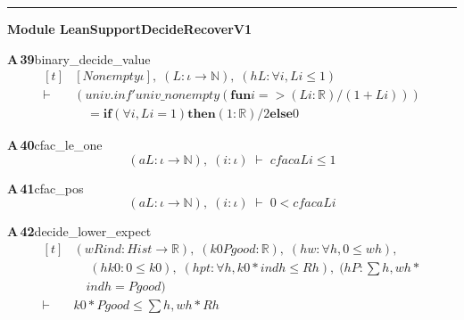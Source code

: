 \documentclass[conference]{IEEEtran}
\theoremstyle{definition}
\newcommand{\lean}[1]{\textsf{\footnotesize #1}}
\begin{document}
\vspace{4pt}\noindent\rule{\columnwidth}{0.4pt}\par\vspace{2pt}
\noindent\textbf{Module \lean{LeanSupportDecideRecoverV1}}\par\vspace{3pt}

\noindent\textbf{A\,39}\quad\lean{binary\_decide\_value}
{\footnotesize\[ \begin{aligned}[t]
&[\mathit{Nonempty} \iota ],\; (\mathit{L} : \iota \to \mathbb{N} ),\; (\mathit{hL} : \forall \mathit{i}, \mathit{L} \mathit{i} \leq 1)\\
\vdash\;&(\mathit{univ}.\mathit{inf'} \mathit{univ\_nonempty} (\mathbf{fun} \mathit{i} => (\mathit{L} \mathit{i} : \mathbb{R} ) / (1 + \mathit{L} \mathit{i})))\\
&\quad = \mathbf{if} (\forall \mathit{i}, \mathit{L} \mathit{i} = 1) \mathbf{then} (1 : \mathbb{R} ) / 2 \mathbf{else} 0
\end{aligned} \]}

\noindent\textbf{A\,40}\quad\lean{cfac\_le\_one}
{\footnotesize\[ (\mathit{a} \mathit{L} : \iota \to \mathbb{N} ),\; (\mathit{i} : \iota ) \;\vdash\; \mathit{cfac} \mathit{a} \mathit{L} \mathit{i} \leq 1 \]}

\noindent\textbf{A\,41}\quad\lean{cfac\_pos}
{\footnotesize\[ (\mathit{a} \mathit{L} : \iota \to \mathbb{N} ),\; (\mathit{i} : \iota ) \;\vdash\; 0 < \mathit{cfac} \mathit{a} \mathit{L} \mathit{i} \]}

\noindent\textbf{A\,42}\quad\lean{decide\_lower\_expect}
{\footnotesize\[ \begin{aligned}[t]
&(\mathit{w} \mathit{R} \mathit{ind} : \mathit{Hist} \to \mathbb{R} ),\; (\mathit{k0} \mathit{Pgood} : \mathbb{R} ),\; (\mathit{hw} : \forall \mathit{h}, 0 \leq \mathit{w} \mathit{h}),\\
&\quad \; (\mathit{hk0} : 0 \leq \mathit{k0}),\; (\mathit{hpt} : \forall \mathit{h}, \mathit{k0} * \mathit{ind} \mathit{h} \leq \mathit{R} \mathit{h}),\; (\mathit{hP} : \textstyle\sum \mathit{h}, \mathit{w} \mathit{h} *\\
&\quad \mathit{ind} \mathit{h} = \mathit{Pgood})\\
\vdash\;&\mathit{k0} * \mathit{Pgood} \leq \textstyle\sum \mathit{h}, \mathit{w} \mathit{h} * \mathit{R} \mathit{h}
\end{aligned} \]}
\end{document}
